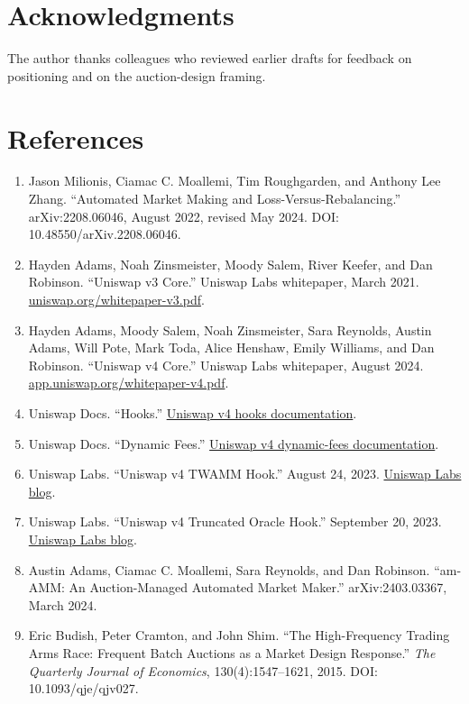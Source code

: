 \documentclass[11pt]{article}
\begin{document}
\section*{Acknowledgments}
The author thanks colleagues who reviewed earlier drafts for feedback on positioning and on the auction-design framing.

\clearpage
\section*{References}
\begin{enumerate}[leftmargin=0.25in]
\item Jason Milionis, Ciamac C. Moallemi, Tim Roughgarden, and Anthony Lee Zhang. ``Automated Market Making and Loss-Versus-Rebalancing.'' arXiv:2208.06046, August 2022, revised May 2024. DOI: 10.48550/arXiv.2208.06046.
\item Hayden Adams, Noah Zinsmeister, Moody Salem, River Keefer, and Dan Robinson. ``Uniswap v3 Core.'' Uniswap Labs whitepaper, March 2021. \href{https://uniswap.org/whitepaper-v3.pdf}{uniswap.org/whitepaper-v3.pdf}.
\item Hayden Adams, Moody Salem, Noah Zinsmeister, Sara Reynolds, Austin Adams, Will Pote, Mark Toda, Alice Henshaw, Emily Williams, and Dan Robinson. ``Uniswap v4 Core.'' Uniswap Labs whitepaper, August 2024. \href{https://app.uniswap.org/whitepaper-v4.pdf}{app.uniswap.org/whitepaper-v4.pdf}.
\item Uniswap Docs. ``Hooks.'' \href{https://developers.uniswap.org/docs/protocols/v4/concepts/hooks}{Uniswap v4 hooks documentation}.
\item Uniswap Docs. ``Dynamic Fees.'' \href{https://developers.uniswap.org/docs/protocols/v4/concepts/dynamic-fees}{Uniswap v4 dynamic-fees documentation}.
\item Uniswap Labs. ``Uniswap v4 TWAMM Hook.'' August 24, 2023. \href{https://blog.uniswap.org/v4-twamm-hook}{Uniswap Labs blog}.
\item Uniswap Labs. ``Uniswap v4 Truncated Oracle Hook.'' September 20, 2023. \href{https://blog.uniswap.org/uniswap-v4-truncated-oracle-hook}{Uniswap Labs blog}.
\item Austin Adams, Ciamac C. Moallemi, Sara Reynolds, and Dan Robinson. ``am-AMM: An Auction-Managed Automated Market Maker.'' arXiv:2403.03367, March 2024.
\item Eric Budish, Peter Cramton, and John Shim. ``The High-Frequency Trading Arms Race: Frequent Batch Auctions as a Market Design Response.'' \emph{The Quarterly Journal of Economics}, 130(4):1547--1621, 2015. DOI: 10.1093/qje/qjv027.
\end{enumerate}
\end{document}

